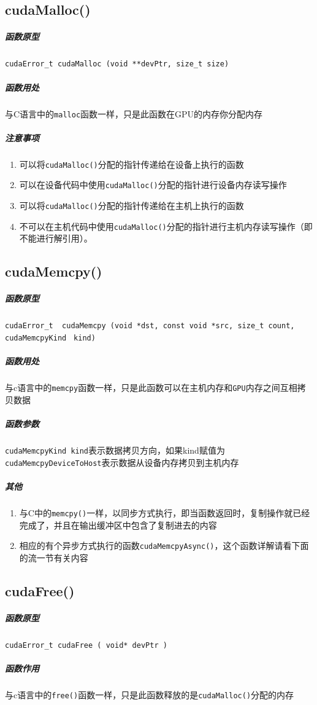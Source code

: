 \documentclass[UTF8,a4paper,12pt]{ctexbook}
\begin{document}
		\subsection{cudaMalloc()}
			\subparagraph{函数原型} \verb|cudaError_t cudaMalloc (void **devPtr, size_t size)|
			\subparagraph{函数用处} 与C语言中的\verb|malloc|函数一样，只是此函数在GPU的内存你分配内存
			\subparagraph{注意事项}
				\begin{enumerate}[itemindent = 1em]
					\item 可以将\verb|cudaMalloc()|分配的指针传递给在设备上执行的函数
					\item 可以在设备代码中使用\verb|cudaMalloc()|分配的指针进行设备内存读写操作
					\item 可以将\verb|cudaMalloc()|分配的指针传递给在主机上执行的函数
					\item 不可以在主机代码中使用\verb|cudaMalloc()|分配的指针进行主机内存读写操作（即不能进行解引用）。
				\end{enumerate}
				
		\subsection{cudaMemcpy()}
			\subparagraph{函数原型} \verb|cudaError_t  cudaMemcpy (void *dst, const void *src, size_t count,| \verb|cudaMemcpyKind| \verb| kind)|
			\subparagraph{函数用处} 与c语言中的\verb|memcpy|函数一样，只是此函数可以在主机内存和\verb|GPU|内存之间互相拷贝数据
			\subparagraph{函数参数} \verb|cudaMemcpyKind kind|表示数据拷贝方向，如果kind赋值为\verb|cudaMemcpyDeviceToHost|表示数据从设备内存拷贝到主机内存		
			\subparagraph{其他}
				\begin{enumerate}[itemindent = 1em]
					\item 与C中的\verb|memcpy()|一样，以同步方式执行，即当函数返回时，复制操作就已经完成了，并且在输出缓冲区中包含了复制进去的内容
					\item 相应的有个异步方式执行的函数\verb|cudaMemcpyAsync()|，这个函数详解请看下面的流一节有关内容
				\end{enumerate}
			
		\subsection{cudaFree()}
			\subparagraph{函数原型}\verb|cudaError_t cudaFree ( void* devPtr )|
			\subparagraph{函数作用}与c语言中的\verb|free()|函数一样，只是此函数释放的是\verb|cudaMalloc()|分配的内存
			
\end{document}

